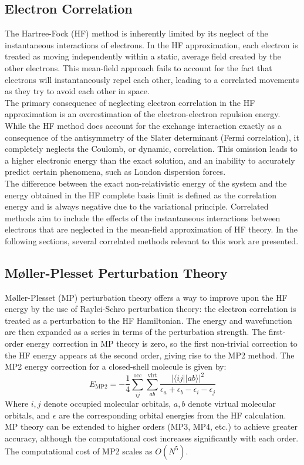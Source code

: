 \subsection{Electron Correlation}
\label{subsec:electron_correlation}
The Hartree-Fock (HF) method is inherently limited by its neglect of the instantaneous interactions of electrons. In the HF approximation, each electron is treated as moving independently within a static, average field created by the other electrons. This mean-field approach fails to account for the fact that electrons will instantaneously repel each other, leading to a correlated movements as they try to avoid each other in space.\\
The primary consequence of neglecting electron correlation in the HF approximation is an overestimation of the electron-electron repulsion energy. While the HF method does account for the exchange interaction exactly as a consequence of the antisymmetry of the Slater determinant (Fermi correlation), it completely neglects the Coulomb, or dynamic, correlation. This omission leads to a higher electronic energy than the exact solution, and an inability to accurately predict certain phenomena, such as London dispersion forces.\\
The difference between the exact non-relativistic energy of the system and the energy obtained in the HF complete basis limit is defined as the correlation energy and is always negative due to the variational principle. Correlated methods aim to include the effects of the instantaneous interactions between electrons that are neglected in the mean-field approximation of HF theory. In the following sections, several correlated methods relevant to this work are presented.

\subsection{Møller-Plesset Perturbation Theory}
Møller-Plesset (MP) perturbation theory offers a way to improve upon the HF energy by the use of Raylei-Schro perturbation theory: the electron correlation is treated as a perturbation to the HF Hamiltonian. The energy and wavefunction are then expanded as a series in terms of the perturbation strength. The first-order energy correction in MP theory is zero, so the first non-trivial correction to the HF energy appears at the second order, giving rise to the MP2 method. The MP2 energy correction for a closed-shell molecule is given by:
\begin{equation} \label{eq:MP2}
    E_{\mathrm{MP2}} = - \frac{1}{4} \sum_{ij}^{\mathrm{occ}} \sum_{ab}^{\mathrm{virt}} \frac{|\langle i j || a b \rangle|^2}{\epsilon_a + \epsilon_b - \epsilon_i - \epsilon_j}
\end{equation}
Where $i,j$ denote occupied molecular orbitals, $a,b$ denote virtual molecular orbitals, and $\epsilon$ are the corresponding orbital energies from the HF calculation. MP theory can be extended to higher orders (MP3, MP4, etc.) to achieve greater accuracy, although the computational cost increases significantly with each order. The computational cost of MP2 scales as $O(N^5)$.

